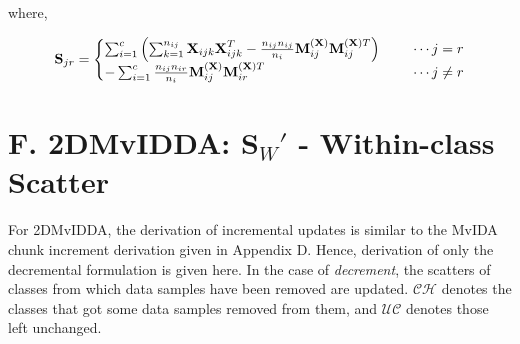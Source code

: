 \noindent
where,

\begin{equation*}
\textbf{S}_{jr} = \left\{\begin{matrix*}[l]
\sum_{i=1}^{c} \left ( \sum_{k=1}^{n_{ij}} \textbf{X}_{ijk }\textbf{X}_{ijk}^T - \frac{n_{ij} n_{ij}}{n_i} \textbf{M}_{ij}^{(\textbf{X})} \textbf{M}_{ij}^{(\textbf{X})T} \right ) & \hspace{0.5cm} \cdots j=r
\\ 
-\sum_{i=1}^{c} \frac{n_{ij} n_{ir}}{n_i} \textbf{M}_{ij}^{(\textbf{X})} \textbf{M}_{ir}^{(\textbf{X})T} & \hspace{0.5cm} \cdots j\neq r 
\end{matrix*}\right.
\end{equation*}










\section*{F. 2DMvIDDA: $\textbf{S}_W'$ - Within-class Scatter}
\label{proof:2DMvIDDA_Sjr}
For 2DMvIDDA, the derivation of incremental updates is similar to the MvIDA chunk increment derivation given in Appendix D. Hence, derivation of only the decremental formulation is given here. In the case of \textit{decrement}, the scatters of classes from which data samples have been removed are updated. $\mathcal{CH}$ denotes the classes that got some data samples removed from them, and $\mathcal{UC}$ denotes those left unchanged.

